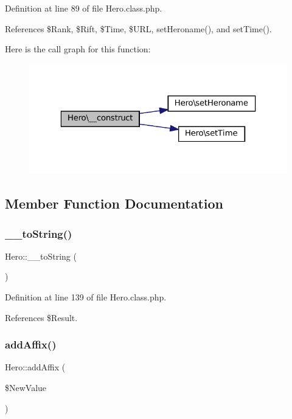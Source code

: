 Definition at line 89 of file Hero.\+class.\+php.



References \$\+Rank, \$\+Rift, \$\+Time, \$\+U\+RL, set\+Heroname(), and set\+Time().

Here is the call graph for this function\+:\nopagebreak
\begin{figure}[H]
\begin{center}
\leavevmode
\includegraphics[width=323pt]{class_hero_a8f3b4b60f444d9df9015dd01c9d594d9_cgraph}
\end{center}
\end{figure}


\subsection{Member Function Documentation}
\mbox{\label{class_hero_ae675b892a209f61bdc1a4db24a6487ef}} 
\subsubsection{\texorpdfstring{\+\_\+\+\_\+to\+String()}{\_\_toString()}}
{\footnotesize\ttfamily Hero\+::\+\_\+\+\_\+to\+String (\begin{DoxyParamCaption}{ }\end{DoxyParamCaption})}



Definition at line 139 of file Hero.\+class.\+php.



References \$\+Result.

\mbox{\label{class_hero_aa6fb2135453af0ad7c16960f5d0a8412}} 
\subsubsection{\texorpdfstring{add\+Affix()}{addAffix()}}
{\footnotesize\ttfamily Hero\+::add\+Affix (\begin{DoxyParamCaption}\item[{}]{\$\+New\+Value }\end{DoxyParamCaption})}




